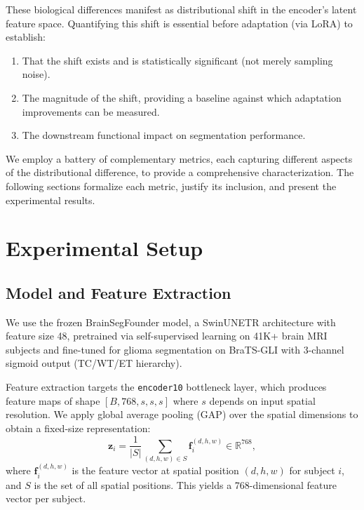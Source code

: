 \documentclass[11pt,a4paper]{article}
\newcommand{\R}{\mathbb{R}}
\theoremstyle{definition}
\begin{document}
These biological differences manifest as distributional shift in the encoder's latent feature space. Quantifying this shift is essential before adaptation (via LoRA) to establish:
\begin{enumerate}[nosep]
  \item That the shift exists and is statistically significant (not merely sampling noise).
  \item The magnitude of the shift, providing a baseline against which adaptation improvements can be measured.
  \item The downstream functional impact on segmentation performance.
\end{enumerate}

We employ a battery of complementary metrics, each capturing different aspects of the distributional difference, to provide a comprehensive characterization. The following sections formalize each metric, justify its inclusion, and present the experimental results.


\section{Experimental Setup}\label{sec:setup}

\subsection{Model and Feature Extraction}

We use the frozen BrainSegFounder model, a SwinUNETR architecture \cite{hatamizadeh2022swinunetr} with feature size 48, pretrained via self-supervised learning on 41K+ brain MRI subjects and fine-tuned for glioma segmentation on BraTS-GLI with 3-channel sigmoid output (TC/WT/ET hierarchy).

Feature extraction targets the \texttt{encoder10} bottleneck layer, which produces feature maps of shape $[B, 768, s, s, s]$ where $s$ depends on input spatial resolution. We apply global average pooling (GAP) over the spatial dimensions to obtain a fixed-size representation:
\begin{equation}\label{eq:gap}
  \bm{z}_i = \frac{1}{|S|} \sum_{(d,h,w) \in S} \bm{f}_i^{(d,h,w)} \in \R^{768},
\end{equation}
where $\bm{f}_i^{(d,h,w)}$ is the feature vector at spatial position $(d,h,w)$ for subject $i$, and $S$ is the set of all spatial positions. This yields a 768-dimensional feature vector per subject.
\end{document}
